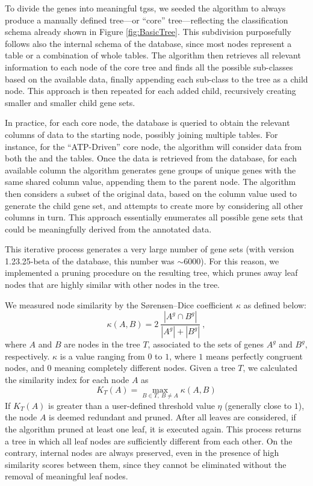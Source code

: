 To divide the genes into meaningful \glspl{tgs}, we seeded the algorithm to always produce a manually defined tree---or ``core'' tree---reflecting the classification schema already shown in Figure \ref{fig:BasicTree}.
This subdivision purposefully follows also the internal schema of the database, since most nodes represent a table or a combination of whole tables.
The algorithm then retrieves all relevant information to each node of the core tree and finds all the possible sub-classes based on the available data, finally appending each sub-class to the tree as a child node.
This approach is then repeated for each added child, recursively creating smaller and smaller child gene sets.

In practice, for each core node, the database is queried to obtain the relevant columns of data to the starting node, possibly joining multiple tables.
For instance, for the ``ATP-Driven'' core node, the algorithm will consider data from both the  and the  tables.
Once the data is retrieved from the database, for each available column the algorithm generates gene groups of unique genes with the same shared column value, appending them to the parent node.
The algorithm then considers a subset of the original data, based on the column value used to generate the child gene set, and attempts to create more by considering all other columns in turn.
This approach essentially enumerates all possible gene sets that could be
meaningfully derived from the annotated data.

This iterative process generates a very large number of gene sets (with version 1.23.25-beta of the database, this number was $\sim 6000$).
For this reason, we implemented a pruning procedure on the resulting tree, which prunes away leaf nodes that are highly similar with other nodes in the tree.

We measured node similarity by the Sørensen–Dice coefficient $\kappa$ as defined below:
\begin{equation}
    \kappa\left(A,B\right) = 2\ \frac{\left|A^g \cap B^g\right|}{\left|A^g\right|+\left|B^g\right|}\ ,
    \label{eq:node_similarity_1}
\end{equation}
where $A$ and $B$ are nodes in the tree $T$, associated to the sets of genes $A^g$ and $B^g$, respectively.
$\kappa$ is a value ranging from $0$ to $1$, where $1$ means perfectly congruent nodes, and $0$ meaning completely different nodes.
Given a tree $T$, we calculated the similarity index for each node $A$ as
\begin{equation}
    K_T\left(A\right) = \max_{B \in T,\ B \neq A}\kappa\left(A,B\right)
    \label{eq:node_similarity_2}
\end{equation}
If $K_T\left(A\right)$ is greater than a user-defined threshold value $\eta$ (generally close to $1$), the node $A$ is deemed redundant and pruned.
After all leaves are considered, if the algorithm pruned at least one leaf, it is executed again.
This process returns a tree in which all leaf nodes are sufficiently different from each other.
On the contrary, internal nodes are always preserved, even in the presence of high similarity scores between them, since they cannot be eliminated without the removal of meaningful leaf nodes.

